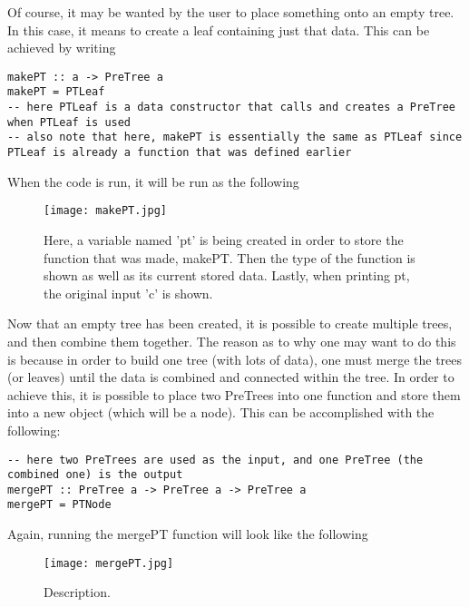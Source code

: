 \documentclass{article}
\begin{document}
Of course, it may be wanted by the user to place something onto an empty tree.
In this case, it means to create a leaf containing just that data.
This can be achieved by writing 
\begin{lstlisting}
makePT :: a -> PreTree a
makePT = PTLeaf
-- here PTLeaf is a data constructor that calls and creates a PreTree when PTLeaf is used
-- also note that here, makePT is essentially the same as PTLeaf since  PTLeaf is already a function that was defined earlier
\end{lstlisting}
When the code is run, it will be run as the following
\begin{figure}[htp]
    \centering
    \texttt{[image: makePT.jpg]}
    \caption{Here, a variable named 'pt' is being created in order to store the function that was made, makePT. Then the type of the function is shown as well as its current stored data. Lastly, when printing pt, the original input 'c' is shown.}
    \label{fig: Haskell in Command Line}
\end{figure}
Now that an empty tree has been created, it is possible to create multiple trees, and then combine them together.
The reason as to why one may want to do this is because in order to build one tree (with lots of data), one must merge the trees (or leaves) until the data is combined and connected within the tree.
In order to achieve this, it is possible to place two PreTrees into one function and store them into a new object (which will be a node).
This can be accomplished with the following:
\begin{lstlisting}
-- here two PreTrees are used as the input, and one PreTree (the combined one) is the output
mergePT :: PreTree a -> PreTree a -> PreTree a
mergePT = PTNode
\end{lstlisting}

Again, running the mergePT function will look like the following
\begin{figure}[htp]
    \centering
    \texttt{[image: mergePT.jpg]}
    \caption{Description.}
    \label{fig: Haskell in Command Line}
\end{figure}
\end{document}
